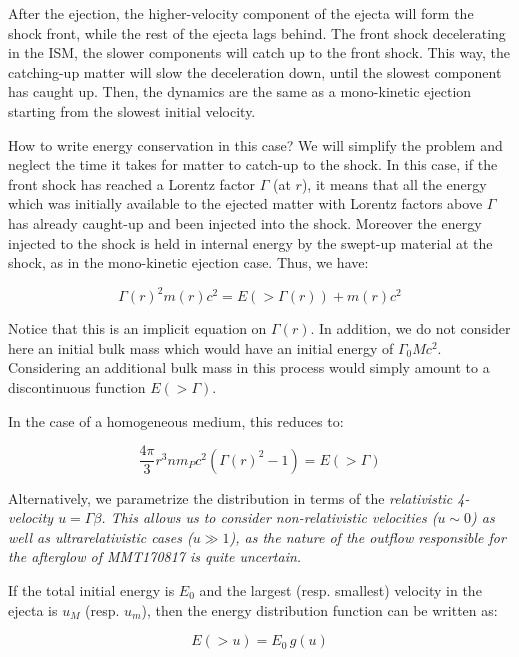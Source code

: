 After the ejection, the higher-velocity component of the ejecta will form the shock front, while the rest of the ejecta lags behind. The front shock decelerating in the ISM, the slower components will catch up to the front shock. This way, the catching-up matter will slow the deceleration down, until the slowest component has caught up. Then, the dynamics are the same as a mono-kinetic ejection starting from the slowest initial velocity.

How to write energy conservation in this case? We will simplify the problem and neglect the time it takes for matter to catch-up to the shock. In this case, if the front shock has reached a Lorentz factor $\Gamma$ (at $r$), it means that all the energy which was initially available to the ejected matter with Lorentz factors above $\Gamma$ has already caught-up and been injected into the shock. Moreover the energy injected to the shock is held in internal energy by the swept-up material at the shock, as in the mono-kinetic ejection case. Thus, we have:

\begin{equation} \Gamma(r)^2 m(r) c ^ 2 = E( > \Gamma(r)) + m(r) c ^ 2\end{equation}

Notice that this is an implicit equation on $\Gamma(r)$. In addition, we do not consider here an initial bulk mass which would have an initial energy of $\Gamma_0 M c^2$. Considering an additional bulk mass in this process would simply amount to a discontinuous function $ E( > \Gamma)$.

In the case of a homogeneous medium, this reduces to:

\begin{equation}\frac{4\pi}{3}r^3 n m_P c^2(\Gamma(r)^2 - 1) = E( > \Gamma) \end{equation}


Alternatively, we parametrize the distribution in terms of the \it{relativistic 4-velocity} $u = \Gamma \beta$. This allows us to consider non-relativistic velocities ($u \sim 0$) as well as ultrarelativistic cases ($u \gg 1$), as the nature of the outflow responsible for the afterglow of MMT170817 is quite uncertain.

If the total initial energy is $E_0$ and the largest (resp. smallest) velocity in the ejecta is $u_M$ (resp. $u_m$), then the energy distribution function can be written as:

\begin{equation} E( > u) = E_0\, g(u) \end{equation}

